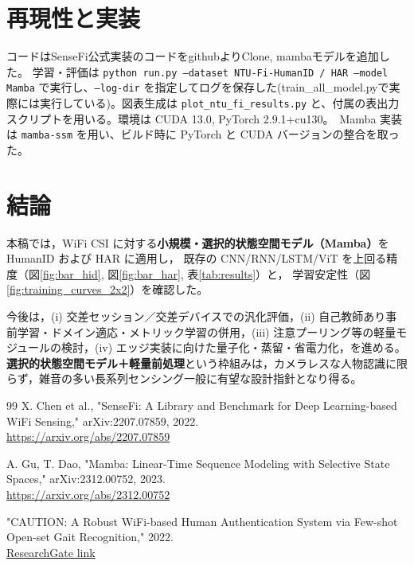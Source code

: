 \documentclass[11pt]{ltjsarticle}
\begin{document}
\section{再現性と実装}
コードはSenseFi公式実装のコードをgithubよりClone, mambaモデルを追加した。
学習・評価は \texttt{python run.py --dataset NTU-Fi-HumanID / HAR --model Mamba} で実行し、\texttt{--log-dir} を指定してログを保存した(train\_all\_model.pyで実際には実行している)。図表生成は \texttt{plot\_ntu\_fi\_results.py} と、付属の表出力スクリプトを用いる。環境は CUDA 13.0, PyTorch 2.9.1+cu130。\
Mamba 実装は \texttt{mamba-ssm} を用い、ビルド時に PyTorch と CUDA バージョンの整合を取った。

\section{結論}
本稿では，WiFi CSI に対する\textbf{小規模・選択的状態空間モデル（Mamba）}を HumanID および HAR に適用し，
既存の CNN/RNN/LSTM/ViT を上回る精度（図\ref{fig:bar_hid}, 図\ref{fig:bar_har}, 表\ref{tab:results}）と，
学習安定性（図\ref{fig:training_curves_2x2}）を確認した。


今後は，(i) 交差セッション／交差デバイスでの汎化評価，(ii) 自己教師あり事前学習・ドメイン適応・メトリック学習の併用，(iii) 注意プーリング等の軽量モジュールの検討，(iv) エッジ実装に向けた量子化・蒸留・省電力化，を進める。\textbf{選択的状態空間モデル＋軽量前処理}という枠組みは，カメラレスな人物認識に限らず，雑音の多い長系列センシング一般に有望な設計指針となり得る。


\begin{thebibliography}{99}
X. Chen et al., "SenseFi: A Library and Benchmark for Deep Learning-based WiFi Sensing," arXiv:2207.07859, 2022.\\
\href{https://arxiv.org/abs/2207.07859}{https://arxiv.org/abs/2207.07859}

A. Gu, T. Dao, "Mamba: Linear-Time Sequence Modeling with Selective State Spaces," arXiv:2312.00752, 2023.\\
\href{https://arxiv.org/abs/2312.00752}{https://arxiv.org/abs/2312.00752}

"CAUTION: A Robust WiFi-based Human Authentication System via Few-shot Open-set Gait Recognition," 2022.\\
\href{https://www.researchgate.net/publication/359009301_CAUTION_A_Robust_WiFi-based_Human_Authentication_System_via_Few-shot_Open-set_Gait_Recognition}{ResearchGate link}
\end{thebibliography}
\end{document}
